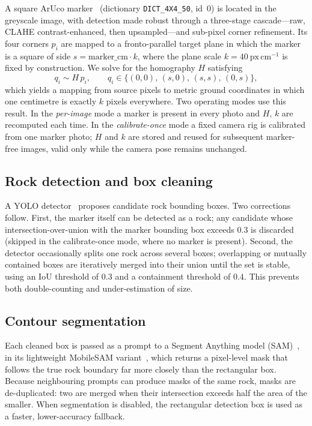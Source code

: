 A square ArUco marker~\cite{garrido2014aruco} (dictionary \texttt{DICT\_4X4\_50},
id~0) is located in the
greyscale image, with detection made robust through a three-stage cascade---raw,
CLAHE contrast-enhanced, then upsampled---and sub-pixel corner refinement. Its
four corners $p_i$ are mapped to a fronto-parallel target plane in which the
marker is a square of side $s = \mathrm{marker\_cm}\cdot k$, where the plane scale
$k = 40~\mathrm{px\,cm^{-1}}$ is fixed by construction. We solve for the
homography $H$ satisfying
\begin{equation}
  q_i \sim H\,p_i, \qquad
  q_i \in \{(0,0),\,(s,0),\,(s,s),\,(0,s)\},
  \label{eq:homography}
\end{equation}
which yields a mapping from source pixels to metric ground coordinates in which
one centimetre is exactly $k$ pixels everywhere. Two operating modes use this
result. In the \emph{per-image} mode a marker is present in every photo and $H$,
$k$ are recomputed each time. In the \emph{calibrate-once} mode a fixed camera
rig is calibrated from one marker photo; $H$ and $k$ are stored and reused for
subsequent marker-free images, valid only while the camera pose remains
unchanged.

\subsection{Rock detection and box cleaning}
\label{sec:detection}
A YOLO detector~\cite{yolo11} proposes candidate rock bounding boxes. Two corrections follow.
First, the marker itself can be detected as a rock; any candidate whose
intersection-over-union with the marker bounding box exceeds $0.3$ is discarded
(skipped in the calibrate-once mode, where no marker is present). Second, the
detector occasionally splits one rock across several boxes; overlapping or
mutually contained boxes are iteratively merged into their union until the set is
stable, using an IoU threshold of $0.3$ and a containment threshold of $0.4$.
This prevents both double-counting and under-estimation of size.

\subsection{Contour segmentation}
\label{sec:segmentation}
Each cleaned box is passed as a prompt to a Segment Anything model
(SAM)~\cite{kirillov2023sam}, in its lightweight MobileSAM
variant~\cite{zhang2023mobilesam}, which
returns a pixel-level mask that follows the true rock boundary far more closely
than the rectangular box. Because neighbouring prompts can produce masks of the
same rock, masks are de-duplicated: two are merged when their intersection
exceeds half the area of the smaller. When segmentation is disabled, the
rectangular detection box is used as a faster, lower-accuracy fallback.

